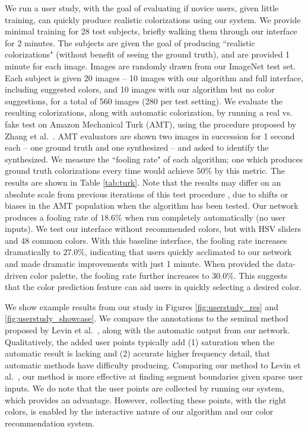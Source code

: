 \documentclass[acmtog,authorversion]{acmart}
\begin{document}
 
We run a user study, with the goal of evaluating if novice users, given little training, can quickly produce realistic colorizations using our system. We provide minimal training for 28 test subjects, briefly walking them through our interface for 2 minutes. The subjects are given the goal of producing ``realistic colorizations" (without benefit of seeing the ground truth), and are provided 1 minute for each image. Images are randomly drawn from our ImageNet test set. Each subject is given 20 images -- 10 images with our algorithm and full interface, including suggested colors, and 10 images with our algorithm but no color suggestions, for a total of 560 images (280 per test setting). We evaluate the resulting colorizations, along with automatic colorization, by running a real vs. fake test on Amazon Mechanical Turk (AMT), using the procedure proposed by Zhang et al.~. AMT evaluators are shown two images in succession for 1 second each -- one ground truth and one synthesized -- and asked to identify the synthesized. We measure the ``fooling rate" of each algorithm; one which produces ground truth colorizations every time would achieve $50\%$ by this metric. The results are shown in Table \ref{tab:turk}. Note that the results may differ on an absolute scale from previous iterations of this test procedure \cite{zhang2016colorful,isola2016image}, due to shifts or biases in the AMT population when the algorithm has been tested. Our network produces a fooling rate of $18.6\%$ when run completely automatically (no user inputs). We test our interface without recommended colors, but with HSV sliders and 48 common colors. With this baseline interface, the fooling rate increases dramatically to $27.0\%$, indicating that users quickly acclimated to our network and made dramatic improvements with just 1 minute. When provided the data-driven color palette, the fooling rate further increases to $30.0\%$. This suggests that the color prediction feature can aid users in quickly selecting a desired color.

We show example results from our study in Figures \ref{fig:userstudy_res} and \ref{fig:userstudy_showcase}. We compare the annotations to the seminal method proposed by Levin et al.~, along with the automatic output from our network. Qualitatively, the added user points typically add (1) saturation when the automatic result is lacking and (2) accurate higher frequency detail, that automatic methods have difficulty producing. Comparing our method to Levin et al.~, our method is more effective at finding segment boundaries given sparse user inputs. We do note that the user points are collected by running our system, which provides an advantage. However, collecting these points, with the right colors, is enabled by the interactive nature of our algorithm and our color recommendation system.
\end{document}
